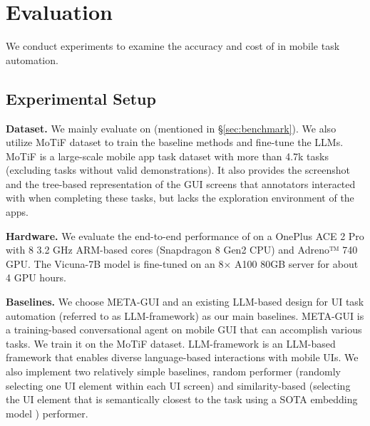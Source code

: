 \section{Evaluation}
\label{sec:experiment}

We conduct experiments to examine the accuracy and cost of \name in mobile task automation.

\subsection{Experimental Setup}
\label{eval:setup}
\textbf{Dataset.}
We mainly evaluate \name on \datasetname (mentioned in \S\ref{sec:benchmark}). We also utilize MoTiF \cite{motif} dataset to train the baseline methods and fine-tune the LLMs. MoTiF \cite{motif} is a large-scale mobile app task dataset with more than 4.7k tasks (excluding tasks without valid demonstrations). It also provides the screenshot and the tree-based representation of the GUI screens that annotators interacted with when completing these tasks, but lacks the exploration environment of the apps.

\textbf{Hardware.}
We evaluate the end-to-end performance of \name on a OnePlus ACE 2 Pro with 8 3.2 GHz ARM-based cores (Snapdragon 8 Gen2 CPU) and Adreno™ 740 GPU. The Vicuna-7B model is fine-tuned on an 8$\times$ A100 80GB server for about 4 GPU hours.

\textbf{Baselines.}
We choose META-GUI \cite{metagui} and an existing LLM-based design for UI task automation \cite{talking_with_ui} (referred to as LLM-framework) as our main baselines.
META-GUI \cite{metagui} is a training-based conversational agent on mobile GUI that can accomplish various tasks. We train it on the MoTiF \cite{motif} dataset.
LLM-framework \cite{talking_with_ui} is an LLM-based framework that enables diverse language-based interactions with mobile UIs.
We also implement two relatively simple baselines, random performer (randomly selecting one UI element within each UI screen) and similarity-based (selecting the UI element that is semantically closest to the task using a SOTA embedding model \cite{instructor-xl}) performer. %

